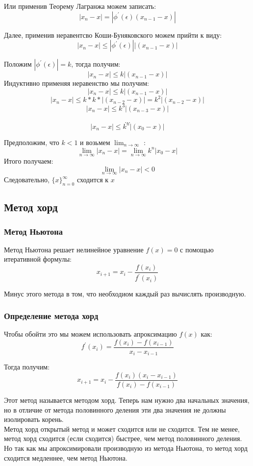 \documentclass[11pt, english]{article}
\begin{document}
Или применив Теорему Лагранжа можем записать:
$$|x_n - x | = |\phi^{'}(\epsilon)(x_{n-1} - x)|$$

Далее, применив неравентсво Коши-Буняковского можем прийти к виду:
$$|x_n - x | \leq |\phi^{'}(\epsilon)||(x_{n-1} - x)|$$

Положим $|\phi^{'}(\epsilon)| = k$, тогда получим:
$$|x_n - x | \leq k|(x_{n-1} - x)|$$
Индуктивно применяя неравенство мы получим:
$$|x_n - x | \leq k|(x_{n-1} - x)|$$
$$|x_n - x | \leq k*k*|(x_{n-2} - x)| = k^2|(x_{n-2} - x)|$$
$$|x_n - x | \leq k^3|(x_{n-3} - x)|$$\\
$$...$$
$$|x_n - x | \leq k^n|(x_0 - x)|$$

Предположим, что $k < 1$ и возьмем $\lim_{n\to\infty}$ :
$$\lim_{n\to\infty} |x_n - x| = \lim_{n\to\infty} k^n|x_0 - x|$$
Итого получаем:
$$\lim_{n\to\infty}|x_n - x| < 0$$
Следовательно, $\{x\}^{\infty}_{n=0}$ сходится к $x$

\subsection{Метод хорд}
\subsubsection{Метод Ньютона}
Метод Ньютона решает нелинейное уравнение $f(x) = 0$ с помощью итеративной формулы:
$$x_{i+1} = x_i - \frac{f(x_i)}{f^{'}(x_i)}$$

Минус этого метода в том, что необходиом каждый раз вычислять производную.
\subsubsection{Определение метода хорд}
Чтобы обойти это мы можем использовать апроксимацию $f(x)$ как:
$$f^{'}(x_i) = \frac{f(x_i) - f(x_{i-1})}{x_i - x_{i-1}}$$

Тогда получим:
$$x_{i+1} = x_i - \frac{f(x_i)(x_i - x_{i-1})}{f(x_i) - f(x_{i-1})}$$

Этот метод называется методом хорд. Теперь нам нужно два начальных значения, но в отличие от метода половинного деления эти два значения не должны изолировать корень.\\

Метод хорд открытый метод и может сходится или не сходится. Тем не менее, метод хорд сходится (если сходится) быстрее, чем метод половинного деления. Но так как мы апроксимировали производную из метода Ньютона, то метод хорд сходится медленнее, чем метод Ньютона.
\end{document}
